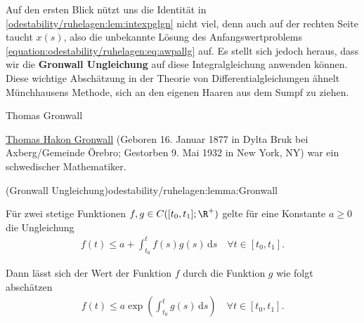 \documentclass[letterpaper,10pt,german]{jupyterBook}
\begin{document}
\par
Auf den ersten Blick nützt uns die Identität in \cref{odestability/ruhelagen:lem:intexpglgn} nicht viel, denn auch auf der rechten Seite taucht \(x(s)\), also die unbekannte Lösung des Anfangswertproblems \eqref{equation:odestability/ruhelagen:eq:awpallg} auf.
Es stellt sich jedoch heraus, dass wir die \textbf{Gronwall Ungleichung} auf diese Integralgleichung anwenden können.
Diese wichtige Abschätzung in der Theorie von Differentialgleichungen ähnelt Münchhausens Methode, sich an den eigenen Haaren aus dem Sumpf zu ziehen.

\begin{emphBox}{Thomas Gronwall}{}

\par
\href{https://de.wikipedia.org/wiki/Thomas\_Hakon\_Gr\%C3\%B6nwall}{Thomas Hakon Gronwall} (Geboren 16. Januar 1877 in Dylta Bruk bei Axberg/Gemeinde Örebro; Gestorben 9. Mai 1932 in New York, NY) war ein schwedischer Mathematiker.
\end{emphBox}
\begin{lemma}{(Gronwall Ungleichung)}{odestability/ruhelagen:lemma:Gronwall}



\par
Für zwei stetige Funktionen \(f,g\in C([t_0,t_1]; \R^+)\) gelte für eine Konstante \(a \geq 0\) die Ungleichung
\begin{align*}
f(t) \leq a + \int_{t_0}^t f(s)g(s)\, \mathrm{d}s \quad \forall t\in [t_0,t_1].
\end{align*}
\par
Dann lässt sich der Wert der Funktion \(f\) durch die Funktion \(g\) wie folgt abschätzen
\begin{align*}
f(t) \leq a \exp{ \left(\int_{t_0}^t g(s)\, \mathrm{d}s \right)} \quad \forall t\in [t_0,t_1].
\end{align*}\end{lemma}
\end{document}
